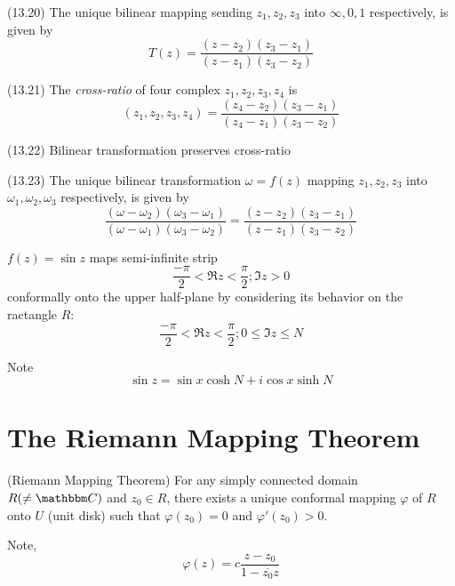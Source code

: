 \documentclass{article}
\begin{document}
\begin{lemma}(13.20)
  The unique bilinear mapping sending \(z_1, z_2, z_3\) into \(\infty, 0, 1\)
  respectively, is given by
  \[T(z) = \frac{(z - z_2)(z_3 - z_1)}{(z - z_1)(z_3 - z_2)}\]
\end{lemma}

\begin{definition}(13.21)
  The \emph{cross-ratio} of four complex \(z_1, z_2, z_3, z_4\) is
  \[(z_1, z_2, z_3, z_4) = \frac{(z_4 - z_2)(z_3 - z_1)}{(z_4 - z_1)(z_3 - z_2)}\]
\end{definition}

\begin{theorem}(13.22)
  Bilinear transformation preserves cross-ratio
\end{theorem}

\begin{theorem}(13.23)
  The unique bilinear transformation \(\omega = f(z)\)
  mapping \(z_1, z_2, z_3\)
  into \(\omega_1, \omega_2, \omega_3\) respectively, is given by
  \[\frac{(\omega - \omega_2)(\omega_3 - \omega_1)}{(\omega - \omega_1)(\omega_3 - \omega_2)} = \frac{(z - z_2)(z_3 - z_1)}{(z - z_1)(z_3 - z_2)}\]
\end{theorem}

\begin{proposition}
  \(f(z) = \sin z\) maps semi-infinite strip
  \[\frac{-\pi}{2} < \Re z < \frac{\pi}{2}; \Im z > 0\]
  conformally onto the upper half-plane by considering its behavior on the ractangle \(R\):
  \[\frac{-\pi}{2} < \Re z < \frac{\pi}{2}; 0 \le \Im z \le N\]
\end{proposition}

Note \[\sin z = \sin x \cosh N + i \cos x \sinh N\]

\section{The Riemann Mapping Theorem}

\begin{theorem}(Riemann Mapping Theorem)
  For any simply connected domain \(R (\neq \bbC)\)
  and \(z_0 \in R\),
  there exists a unique conformal mapping \(\varphi\) of \(R\) onto \(U\) (unit disk)
  such that \(\varphi(z_0) = 0\) and \(\varphi'(z_0) > 0\).

  Note,
  \[\varphi(z) = c \frac{z - z_0}{1 - \overline{z_0}z}\]
\end{theorem}

\end{document}

